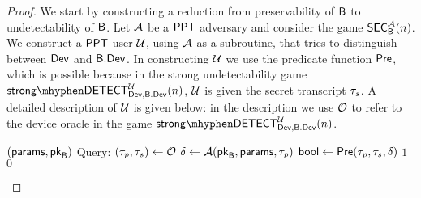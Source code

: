 \begin{proof}
	We start by constructing a reduction from preservability of $\mathsf{B}$ to undetectability of $\mathsf{B}$. Let $\mathcal{A}$ be a $\mathsf{PPT}$ adversary and consider the game $\mathsf{SEC}_{\mathsf{B}}^{\mathcal{A}}(n)$. We construct a $\mathsf{PPT}$ user $\user$, using $\mathcal{A}$ as a subroutine, that tries to distinguish between $\operatorname{\mathsf{Dev}}$ and $\mathsf{B}.\mathsf{Dev}$. In constructing $\user$ we use the predicate function $\operatorname{\mathsf{Pre}}$, which is possible because in the strong undetectability game $\strongdetect{\dev}{\bbdev}{\user}$, $\user$ is given the secret transcript $\tau_s$. A detailed description of $\user$ is given below: in the description we use $\operatorname{\mathcal{O}}$ to refer to the device oracle in the game $\strongdetect{\dev}{\bbdev}{\user}$.
	
\begin{Algorithm}[]{6cm}
\captionUser
\caption{$\user$}
\label{alg:ImplySecurity1}
\begin{algorithmic}[1]
\Require $(\mathsf{params},\mathsf{pk}_{\mathsf{B}})$
\State Query: $(\tau_p,\tau_s)\leftarrow\operatorname{\mathcal{O}}$
\State $\delta\leftarrow \mathcal{A}(\mathsf{pk}_{\mathsf{B}},\mathsf{params},\tau_p)$
\State $\mathsf{bool} \leftarrow \operatorname{\mathsf{Pre}}(\tau_p,\tau_s,\delta)$
\If{$\bool = \true$}
\State \Ret $1$
\Else
\State \Ret $0$
\EndIf
\end{algorithmic}
\end{Algorithm} 


\end{proof}
